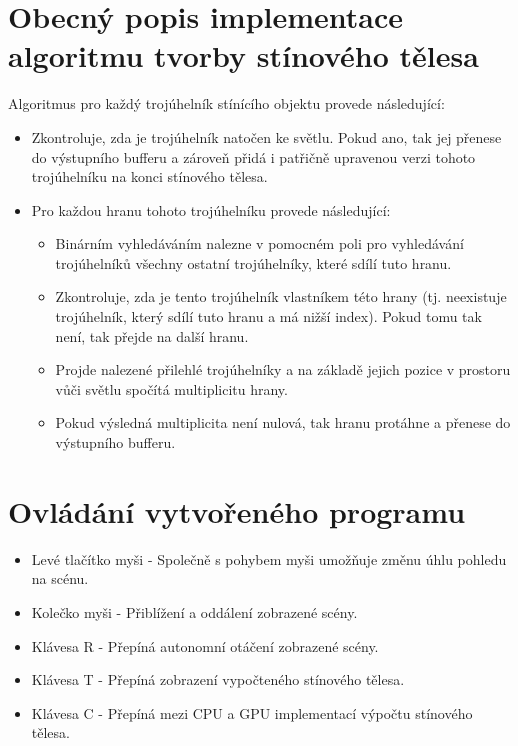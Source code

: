 \documentclass[11pt,a4paper]{article}
\begin{document}
\section{Obecný popis implementace algoritmu tvorby stínového tělesa}

Algoritmus pro každý trojúhelník stínícího objektu provede následující:
\begin{itemize}
	\item Zkontroluje, zda je trojúhelník natočen ke světlu. Pokud ano, tak jej přenese do výstupního bufferu a zároveň přidá i patřičně upravenou verzi tohoto trojúhelníku na konci stínového tělesa.
	\item Pro každou hranu tohoto trojúhelníku provede následující:
		\begin{itemize}
			\item Binárním vyhledáváním nalezne v pomocném poli pro vyhledávání trojúhelníků všechny ostatní trojúhelníky, které sdílí tuto hranu.
			\item Zkontroluje, zda je tento trojúhelník vlastníkem této hrany (tj. neexistuje trojúhelník, který sdílí tuto hranu a má nižší index). Pokud tomu tak není, tak přejde na další hranu.
			\item Projde nalezené přilehlé trojúhelníky a na základě jejich pozice v prostoru vůči světlu spočítá multiplicitu hrany. 
			\item Pokud výsledná multiplicita není nulová, tak hranu protáhne a přenese do výstupního bufferu.
		\end{itemize}
\end{itemize}

\section{Ovládání vytvořeného programu}

\begin{itemize}
	\item Levé tlačítko myši - Společně s pohybem myši umožňuje změnu úhlu pohledu na scénu.
	\item Kolečko myši - Přiblížení a oddálení zobrazené scény.
	\item Klávesa R - Přepíná autonomní otáčení zobrazené scény.
	\item Klávesa T - Přepíná zobrazení vypočteného stínového tělesa.
	\item Klávesa C - Přepíná mezi CPU a GPU implementací výpočtu stínového tělesa.
\end{itemize}
\end{document}
